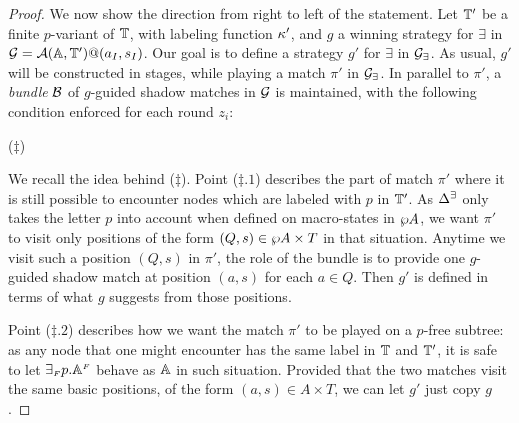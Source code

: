 \begin{proof}
We now show the direction from right to left of the statement. Let $\mathbb{T}'$ be a finite $p$-variant of
$\mathbb{T}$, with labeling function $\kappa'$, and $g$ a winning strategy for $\exists$ in $\mathcal{G} = \mathcal{A}(\mathbb{A},\mathbb{T}')@(a_I,s_I)$. Our goal is to define a strategy $g'$ for $\exists$ in $\mathcal{G_{\exists}}$. 
As usual, $g'$ will be constructed in stages, while playing a match $\pi'$ in $\mathcal{G_{\exists}}$. In parallel to $\pi'$, a \emph{bundle} $\mathcal{B}$ of $g$-guided shadow matches in $\mathcal{G}$ is maintained, with the following condition enforced for each round $z_i$:
\smallskip
\begin{center}
\hspace*{0.3cm}($\ddag$)
\end{center}
\smallskip
We recall the idea behind ($\ddag$). Point ($\ddag.1$) describes the part of match $\pi'$ where it is still possible to encounter nodes which are labeled with $p$ in $\mathbb{T}'$. As $\Delta^\exists$ only takes the letter $p$ into account when defined on macro-states in $\wp A$, we want $\pi'$ to visit only positions of the form $(Q,s) \in \wp A \times T$ in that situation. Anytime we visit such a position $(Q,s)$ in $\pi'$, the role of the bundle is to provide one $g$-guided shadow match at position $(a,s)$ for each $a \in Q$.
Then $g'$ is defined in terms of what $g$ suggests from those positions.

 Point ($\ddag.2$) describes how we want the match $\pi'$ to be
 played on a $p$-free subtree: as any node that one might encounter has the same label in $\mathbb{T}$ and $\mathbb{T}'$,
it is safe to let ${\exists_{{\scriptscriptstyle F}} p}.\mathbb{A}^{{\scriptscriptstyle F}}$ behave as $\mathbb{A}$ in such situation. Provided that the two matches visit the same basic positions, of the form $(a,s)\in A \times T$, we can let $g'$ just copy $g$.


\end{proof}
